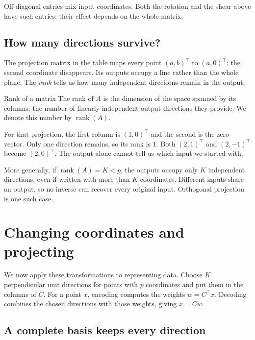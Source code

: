 Off-diagonal entries mix input coordinates. Both the rotation and the
shear above have such entries: their effect depends on the whole matrix.

\subsection{How many directions survive?}

The projection matrix in the table maps every point $(a,b)^\top$
to $(a,0)^\top$: the second coordinate disappears. Its outputs
occupy a line rather than the whole plane. The \emph{rank} tells us
how many independent directions remain in the output.

\begin{frameddefn}{Rank of a matrix}\label{def:matrix-rank}
The rank of $A$ is the dimension of the space spanned by its columns:
the number of linearly independent output directions they provide.
We denote this number by $\operatorname{rank}(A)$.
\end{frameddefn}

For that projection, the first column is $(1,0)^\top$ and the second
is the zero vector. Only one direction remains, so its rank is $1$.
Both $(2,1)^\top$ and $(2,-1)^\top$ become $(2,0)^\top$.
The output alone cannot tell us which input we started with.

More generally, if $\operatorname{rank}(A)=K<p$, the outputs occupy
only $K$ independent directions, even if written with more than $K$
coordinates. Different inputs share an output, so no inverse can
recover every original input. Orthogonal projection is one such case.

\section{Changing coordinates and projecting}

We now apply these transformations to representing data. Choose $K$
perpendicular unit directions for points with $p$ coordinates and put
them in the columns of $C$. For a point $x$, encoding computes the
weights $w=C^\top x$. Decoding combines the chosen directions with
those weights, giving $\hat{x}=Cw$.

\subsection{A complete basis keeps every direction}

